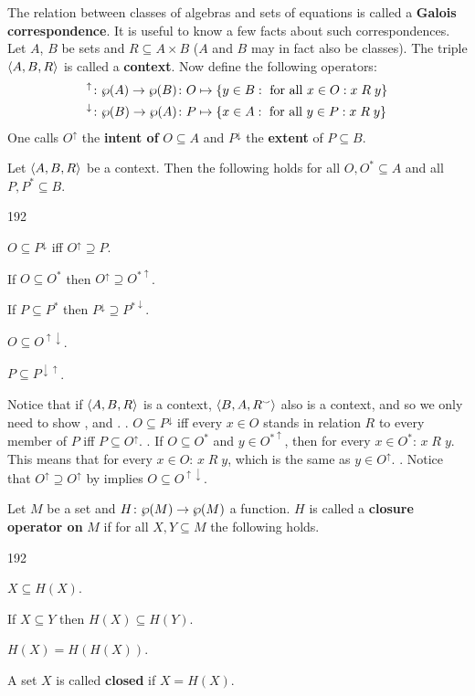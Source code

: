 The relation between classes of algebras and sets of equations is
called a 
\textbf{Galois correspondence}. It is useful to know a few
facts about such correspondences. Let $A$, $B$ be sets and $R
\subseteq A \times B$ ($A$ and $B$ may in fact also be classes). 
The triple $\langle A, B, R\rangle$ is called
a \textbf{context}. Now define the following operators:
\begin{align}
^{\uparrow} \colon \wp(A) \rightarrow \wp(B) \colon & O \mapsto
    \{y \in B : \mbox{ for all }x \in O: x\; R\; y\} \\
^{\downarrow} \colon \wp(B) \rightarrow \wp(A) \colon & P \mapsto
    \{x \in A : \mbox{ for all }y \in P: x\; R\; y\}
\end{align}
One calls $O^{\uparrow}$ the 
\textbf{intent of} $O \subseteq A$ and $P^{\downarrow}$ the 
\textbf{extent} of $P \subseteq B$.
\begin{thm}
Let $\langle A, B, R\rangle$ be a context. Then the following holds
for all $O, O^{\ast} \subseteq A$ and all $P, P^{\ast} \subseteq B$.
\begin{dingautolist}{192}
\item
$O \subseteq P^{\downarrow}$ iff $O^{\uparrow} \supseteq P$.
\item
If $O \subseteq O^{\ast}$ then $O^{\uparrow} \supseteq O^{\ast\uparrow}$.
\item
If $P \subseteq P^{\ast}$ then $P^{\downarrow} \supseteq P^{\ast\downarrow}$.
\item
$O \subseteq O^{\uparrow\downarrow}$.
\item
$P \subseteq P^{\downarrow\uparrow}$.
\end{dingautolist}
\end{thm}
\proofbeg 
Notice that if $\langle A, B, R\rangle$ is a context, $\langle B,
A, R^{\smallsmile}\rangle$ also is a context, and so we only need to show
,  and . . $O \subseteq 
P^{\downarrow}$ iff every $x \in O$ stands in relation $R$ to every 
member of $P$ iff $P \subseteq O^{\uparrow}$. . If $O
\subseteq O^{\ast}$ and $y \in O^{\ast\uparrow}$, then for every $x \in
O^{\ast}$: $x\; R \; y$. This means that for every $x \in O$: $x\; R\;
y$, which is the same as $y \in O^{\uparrow}$. . Notice that
$O^{\uparrow} \supseteq O^{\uparrow}$ by  implies $O \subseteq
O^{\uparrow\downarrow}$. \proofend
\begin{defn}
Let $M$ be a set and $H \colon \wp(M) \rightarrow \wp(M)$ a function.
$H$ is called a \textbf{closure operator on} $M$ if
for all $X, Y \subseteq M$ the following holds.
\begin{dingautolist}{192}
\item $X \subseteq H(X)$.
\item If $X \subseteq Y$ then $H(X) \subseteq H(Y)$.
\item $H(X) = H(H(X))$.
\end{dingautolist}
A set $X$ is called \textbf{closed} if $X = H(X)$.
\end{defn}
